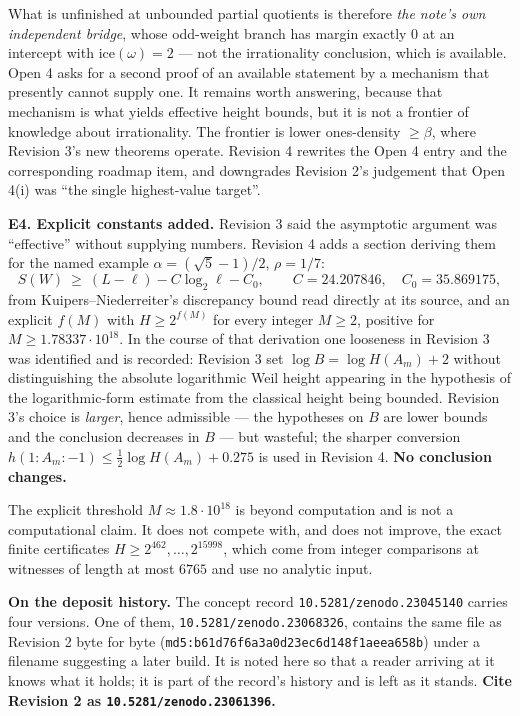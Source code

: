 \documentclass[11pt]{article}
\begin{document}
What is unfinished at unbounded partial quotients is therefore \emph{the note's own independent
bridge}, whose odd-weight branch has margin exactly $0$ at an intercept with
$\mathrm{ice}(\omega)=2$ --- not the irrationality conclusion, which is available. Open 4 asks for a
second proof of an available statement by a mechanism that presently cannot supply one. It remains
worth answering, because that mechanism is what yields effective height bounds, but it is not a
frontier of knowledge about irrationality. The frontier is lower ones-density $\ge\beta$, where
Revision 3's new theorems operate. Revision 4 rewrites the Open 4 entry and the corresponding
roadmap item, and downgrades Revision 2's judgement that Open 4(i) was ``the single highest-value
target''.

\medskip

\noindent\textbf{E4. Explicit constants added.} Revision 3 said the asymptotic argument was
``effective'' without supplying numbers. Revision 4 adds a section deriving them for the named
example $\alpha=(\sqrt5-1)/2$, $\rho=1/7$:
\[
  S(W)\ \ge\ (L-\ell)-C\log_2\ell-C_0,\qquad C=24.207846,\quad C_0=35.869175,
\]
from Kuipers--Niederreiter's discrepancy bound read directly at its source, and an explicit $f(M)$
with $H\ge2^{f(M)}$ for every integer $M\ge2$, positive for $M\ge1.78337\cdot10^{18}$. In the course
of that derivation one looseness in Revision 3 was identified and is recorded: Revision 3 set
$\log B=\log H(A_m)+2$ without distinguishing the absolute logarithmic Weil height appearing in the
hypothesis of the logarithmic-form estimate from the classical height being bounded. Revision 3's
choice is \emph{larger}, hence admissible --- the hypotheses on $B$ are lower bounds and the
conclusion decreases in $B$ --- but wasteful; the sharper conversion
$h(1:A_m:-1)\le\tfrac12\log H(A_m)+0.275$ is used in Revision 4. \textbf{No conclusion changes.}

The explicit threshold $M\approx1.8\cdot10^{18}$ is beyond computation and is not a computational
claim. It does not compete with, and does not improve, the exact finite certificates
$H\ge2^{462},\dots,2^{15998}$, which come from integer comparisons at witnesses of length at most
$6765$ and use no analytic input.

\medskip

\noindent\textbf{On the deposit history.} The concept record \texttt{10.5281/zenodo.23045140} carries
four versions. One of them, \texttt{10.5281/zenodo.23068326}, contains the same file as Revision 2
byte for byte (\texttt{md5:b61d76f6a3a0d23ec6d148f1aeea658b}) under a filename suggesting a later
build. It is noted here so that a reader arriving at it knows what it holds; it is part of the
record's history and is left as it stands. \textbf{Cite Revision 2 as
\texttt{10.5281/zenodo.23061396}.}
\end{document}

